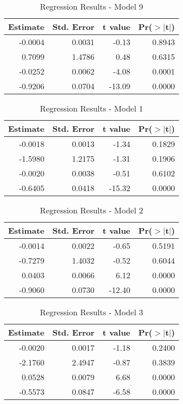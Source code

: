 \begin{table}[ht]
\centering
\begin{tabular}{rrrr}
  \hline
Estimate & Std. Error & t value & Pr($>$$|$t$|$) \\ 
  \hline
-0.0004 & 0.0031 & -0.13 & 0.8943 \\ 
  0.7099 & 1.4786 & 0.48 & 0.6315 \\ 
  -0.0252 & 0.0062 & -4.08 & 0.0001 \\ 
  -0.9206 & 0.0704 & -13.09 & 0.0000 \\ 
   \hline
\end{tabular}
\caption{Regression Results - Model 9} 
\end{table}
\begin{table}[ht]
\centering
\begin{tabular}{rrrr}
  \hline
Estimate & Std. Error & t value & Pr($>$$|$t$|$) \\ 
  \hline
-0.0018 & 0.0013 & -1.34 & 0.1829 \\ 
  -1.5980 & 1.2175 & -1.31 & 0.1906 \\ 
  -0.0020 & 0.0038 & -0.51 & 0.6102 \\ 
  -0.6405 & 0.0418 & -15.32 & 0.0000 \\ 
   \hline
\end{tabular}
\caption{Regression Results - Model 1} 
\end{table}
\begin{table}[ht]
\centering
\begin{tabular}{rrrr}
  \hline
Estimate & Std. Error & t value & Pr($>$$|$t$|$) \\ 
  \hline
-0.0014 & 0.0022 & -0.65 & 0.5191 \\ 
  -0.7279 & 1.4032 & -0.52 & 0.6044 \\ 
  0.0403 & 0.0066 & 6.12 & 0.0000 \\ 
  -0.9060 & 0.0730 & -12.40 & 0.0000 \\ 
   \hline
\end{tabular}
\caption{Regression Results - Model 2} 
\end{table}
\begin{table}[ht]
\centering
\begin{tabular}{rrrr}
  \hline
Estimate & Std. Error & t value & Pr($>$$|$t$|$) \\ 
  \hline
-0.0020 & 0.0017 & -1.18 & 0.2400 \\ 
  -2.1760 & 2.4947 & -0.87 & 0.3839 \\ 
  0.0528 & 0.0079 & 6.68 & 0.0000 \\ 
  -0.5573 & 0.0847 & -6.58 & 0.0000 \\ 
   \hline
\end{tabular}
\caption{Regression Results - Model 3} 
\end{table}

